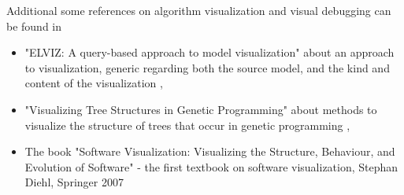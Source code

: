 \documentclass[a4paper, 12pt, bibliography=totoc]{scrartcl}
\begin{document}
Additional some references on algorithm visualization and visual debugging can be found in
\begin{itemize}
	\item "ELVIZ: A query-based approach to model visualization" about an approach to visualization, generic regarding both the source model, and the kind and content of the visualization \cite{ELVIZ},
	
	\item "Visualizing Tree Structures in Genetic Programming" about methods to visualize the structure of trees that occur in genetic programming \cite{VisuTDinGP},
	
	\item The book "Software Visualization: Visualizing the Structure, Behaviour, and Evolution of Software" - the first textbook on software visualization, Stephan Diehl, Springer 2007 \cite{SoftwareVisualization}
\end{itemize}

%

%
\end{document}
